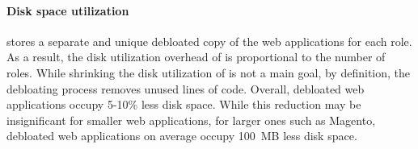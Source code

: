 \paragraph{Disk space utilization} \dbltr{} stores a separate and unique debloated copy of the web applications for each role. 
As a result, the disk utilization overhead of \dbltr{} is proportional to the number of roles. 
While shrinking the disk utilization of \dbltr{} is not a main goal, by definition, the debloating process removes unused lines of code. 
Overall, debloated web applications occupy 5-10\% less disk space. 
While this reduction may be insignificant for smaller web applications, for larger ones such as Magento, debloated web applications on average occupy 100~MB less disk space. 


\begin{table}[]
    \centering
    \caption{Average CPU and Memory utilization of \dbltr{}. \textit{DBLTR N}-Web Servers row shows the range of CPU and Memory utilization for \textit{DBLTR 1} to \textit{DBLTR 50}.}
    \label{tab:performance}
\end{table}